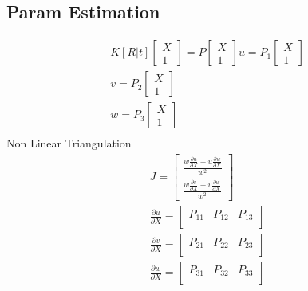 \documentclass[8pt, english]{article}
\begin{document}
\begin{multicols}{4}
\subsection*{Param Estimation}
\begin{align*}
K[R|t] \begin{bmatrix}
X \\ 1 
\end{bmatrix} = P \begin{bmatrix}
X \\1 
\end{bmatrix} 
u = P_1\begin{bmatrix}
X \\1 
\end{bmatrix}\\
v = P_2\begin{bmatrix}
X \\1 
\end{bmatrix}\\ 
w = P_3 \begin{bmatrix}
X \\1 
\end{bmatrix}\\ 
\end{align*}
Non Linear Triangulation\\
\begin{align*}
J = \begin{bmatrix}
\frac{w\frac{\partial u}{\partial X} - u \frac{\partial w}{\partial X}}{ w^2} \\ 
\frac{w\frac{\partial v}{\partial X} - v \frac{\partial w}{\partial X}}{w^2}
\end{bmatrix}\\
\frac{\partial u}{\partial X}  =\begin{bmatrix}
P_{11} & P_{12} & P_{13} \\
\end{bmatrix}\\ 
\frac{\partial v}{\partial X}  =\begin{bmatrix}
P_{21} & P_{22} & P_{23} \\
\end{bmatrix}\\   
\frac{\partial w}{\partial X}  =\begin{bmatrix}
P_{31} & P_{32} & P_{33} \\
\end{bmatrix}
\end{align*}


\end{multicols}
\end{document}
